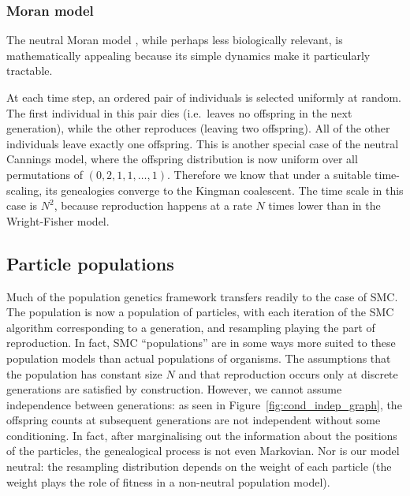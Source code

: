 \subsubsection{Moran model}
The neutral Moran model \parencite{moran1958}, while perhaps less biologically relevant, is mathematically appealing because its simple dynamics make it particularly tractable.

At each time step, an ordered pair of individuals is selected uniformly at random. The first individual in this pair dies (i.e.\ leaves no offspring in the next generation), while the other reproduces (leaving two offspring). All of the other individuals leave exactly one offspring.
This is another special case of the neutral Cannings model, where the offspring distribution is now uniform over all permutations of $(0,2,1,1,\dots,1)$.
Therefore we know that under a suitable time-scaling, its genealogies converge to the Kingman coalescent. The time scale in this case is $N^2$, because reproduction happens at a rate $N$ times  lower than in the Wright-Fisher model. 


\subsection{Particle populations}
Much of the population genetics framework transfers readily to the case of SMC. The population is now a population of particles, with each iteration of the SMC algorithm corresponding to a generation, and resampling playing the part of reproduction.
In fact, SMC ``populations'' are in some ways more suited to these population models than actual populations of organisms.
The assumptions that the population has constant size $N$ and that reproduction occurs only at discrete generations are satisfied by construction.
However, we cannot assume independence between generations: as seen in Figure~\ref{fig:cond_indep_graph}, the offspring counts at subsequent generations are not independent without some conditioning. In fact, after marginalising out the information about the positions of the particles, the genealogical process is not even Markovian.
Nor is our model neutral: the resampling distribution depends on the weight of each particle (the weight plays the role of fitness in a non-neutral population model).






